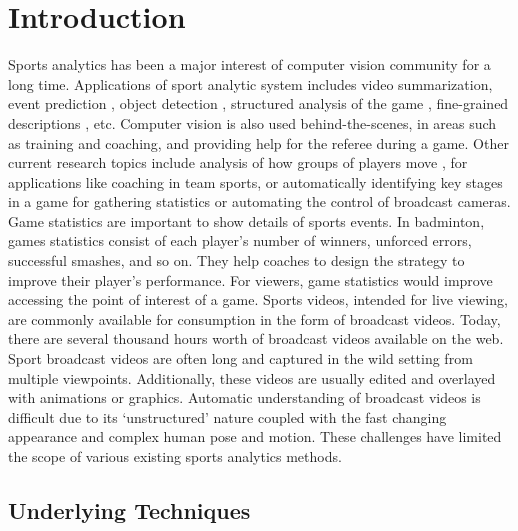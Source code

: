 \documentclass[runningheads,a4paper]{llncs}
\begin{document}
\section{Introduction}

Sports analytics has been a major interest of computer
vision community for a long time. Applications of sport analytic system includes video summarization, event prediction \cite{giancola2018soccernet}, object detection \cite{maksai2016players}, structured analysis of the game \cite{ghosh2018towards}, fine-grained descriptions \cite{sukhwani2015tennisvid2text, sharma2015fine}, etc. Computer vision is also used behind-the-scenes, in areas such as training and coaching, and providing help for the referee during a game. Other current research topics include analysis of how groups of players move \cite{felsen2017will}, for applications like coaching in team sports, or automatically identifying key stages \cite{sharma2017automatic} in a game for gathering statistics or automating the control of broadcast cameras. Game statistics are important to show details of sports events. In badminton, games statistics consist of each player’s number of winners, unforced errors, successful smashes, and so on. They help coaches to design the strategy to improve their player’s performance. For viewers, game statistics would improve accessing the point of interest of a game. Sports videos, intended for live viewing, are commonly available for consumption in the form of broadcast videos. Today, there are several thousand hours worth of broadcast videos available on the web. Sport broadcast videos are often long and captured in the wild setting from multiple viewpoints. Additionally, these videos are usually edited and overlayed with animations or graphics. Automatic understanding of broadcast videos is difficult due to its `unstructured' nature coupled with the fast changing appearance and complex human pose and motion. These challenges have limited the scope of various existing sports analytics methods.

\subsection{Underlying Techniques}
\end{document}
